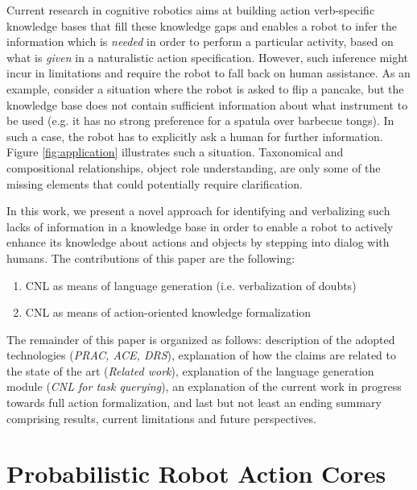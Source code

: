 \documentclass[oribibl]{llncs}
\begin{document}
Current research in cognitive robotics aims at building action 
verb-specific knowledge bases that fill these knowledge gaps and 
enables a robot to infer the information which is \textit{needed} in 
order to perform a particular activity, based on what is \textit 
{given} in a naturalistic action specification. However, such 
inference might incur in limitations and require the robot to fall 
back on human assistance. As an example, consider a situation where 
the robot is asked to flip a pancake, but the knowledge base does 
not contain sufficient information about what instrument to be used 
(e.g. it has no strong preference for a spatula over barbecue 
tongs). In such a case, the robot has to explicitly ask a human for 
further information. Figure \ref{fig:application} illustrates such a 
situation. Taxonomical and compositional relationships, object role 
understanding, are only some of the missing elements that could 
potentially require clarification. 

In this work, we present a novel approach for identifying and 
verbalizing such lacks of information in a knowledge base in order to enable
a robot to actively enhance its knowledge about actions and objects
by stepping into dialog with humans.
The contributions of this paper are the following:
\begin{enumerate}
    \item CNL as means of language generation (i.e. verbalization of doubts)
    \item CNL as means of action-oriented knowledge formalization
\end{enumerate}
The remainder of this paper is organized as follows: 
description of the adopted technologies (\textit{PRAC, ACE, DRS}), explanation of how the claims are related to the state of the art (\textit{Related work}), explanation of the language generation module (\textit{CNL for task querying}), an explanation of the current work in progress towards full action formalization, and last but not least an ending summary comprising results, current limitations and future perspectives. 

\section{Probabilistic Robot Action Cores}
\end{document}

